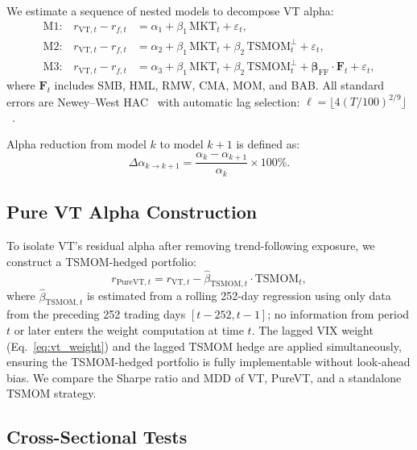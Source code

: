 We estimate a sequence of nested models to decompose VT alpha:
\begin{align}
\text{M1:} \quad r_{\text{VT},t} - r_{f,t} &= \alpha_1 + \beta_1 \, \text{MKT}_t + \varepsilon_t, \label{eq:m1} \\
\text{M2:} \quad r_{\text{VT},t} - r_{f,t} &= \alpha_2 + \beta_1 \, \text{MKT}_t + \beta_2 \, \text{TSMOM}_t^{\perp} + \varepsilon_t, \label{eq:m2} \\
\text{M3:} \quad r_{\text{VT},t} - r_{f,t} &= \alpha_3 + \beta_1 \, \text{MKT}_t + \beta_2 \, \text{TSMOM}_t^{\perp} + \boldsymbol{\beta}_{\text{FF}} \cdot \mathbf{F}_t + \varepsilon_t, \label{eq:m3}
\end{align}
where $\mathbf{F}_t$ includes SMB, HML, RMW, CMA, MOM, and BAB. All standard errors are Newey--West HAC~\citep{newey1987} with automatic lag selection: $\ell = \lfloor 4(T/100)^{2/9} \rfloor$~\citep{newey1994}.

Alpha reduction from model $k$ to model $k+1$ is defined as:
\begin{equation}
\Delta\alpha_{k \to k+1} = \frac{\alpha_k - \alpha_{k+1}}{\alpha_k} \times 100\%.
\label{eq:alpha_reduction}
\end{equation}

\subsection{Pure VT Alpha Construction}

To isolate VT's residual alpha after removing trend-following exposure, we construct a TSMOM-hedged portfolio:
\begin{equation}
r_{\text{PureVT},t} = r_{\text{VT},t} - \hat{\beta}_{\text{TSMOM},t} \cdot \text{TSMOM}_t,
\label{eq:pure_vt}
\end{equation}
where $\hat{\beta}_{\text{TSMOM},t}$ is estimated from a rolling 252-day regression using only data from the preceding 252 trading days $[t-252, t-1]$; no information from period $t$ or later enters the weight computation at time $t$. The lagged VIX weight (Eq.~\ref{eq:vt_weight}) and the lagged TSMOM hedge are applied simultaneously, ensuring the TSMOM-hedged portfolio is fully implementable without look-ahead bias. We compare the Sharpe ratio and MDD of VT, PureVT, and a standalone TSMOM strategy.

\subsection{Cross-Sectional Tests}

